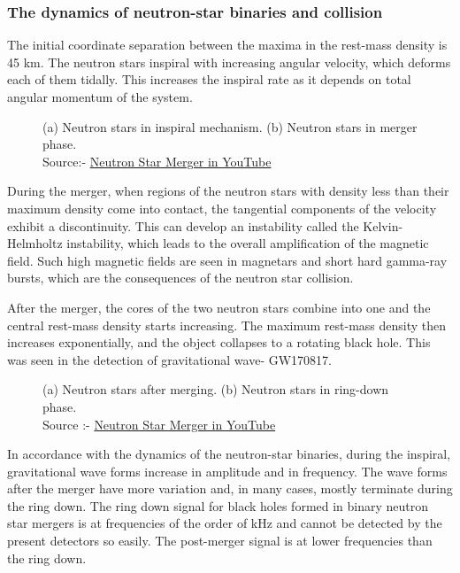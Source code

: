 \subsubsection{The dynamics of neutron-star binaries and collision}

The initial coordinate separation between the maxima in the rest-mass density is 45 km. The neutron stars inspiral with increasing angular velocity, which deforms each of them tidally. This increases the inspiral rate as it depends on total angular momentum of the system. 

\begin{figure}[h]
    \centering
    \qquad
    \caption{(a) Neutron stars in inspiral mechanism. (b) Neutron stars in merger phase.\\ Source:- \href{https://youtu.be/y8VDwGi0r0E}{Neutron Star Merger in YouTube}}
\end{figure}

\noindent
During the merger, when regions of the neutron stars with density less than their maximum density come into contact, the tangential components of the velocity exhibit a discontinuity. This can develop an instability called the Kelvin-Helmholtz instability, which leads to the overall amplification of the magnetic field. Such high magnetic fields are seen in magnetars and short hard gamma-ray bursts, which are the consequences of the neutron star collision.

After the merger, the cores of the two neutron stars combine into one and the central rest-mass density starts increasing. The maximum rest-mass density then increases exponentially, and the object collapses to a rotating black hole. This was seen in the detection of gravitational wave- GW170817.

\begin{figure}[h]
    \centering
    \qquad
    \caption{(a) Neutron stars after merging. (b) Neutron stars in ring-down phase. \\ Source :- \href{https://youtu.be/y8VDwGi0r0E}{Neutron Star Merger in YouTube}} 
\end{figure}

In accordance with the dynamics of the neutron-star binaries, during the inspiral, gravitational wave forms increase in amplitude and in frequency. 
The wave forms after the merger have more variation and, in many cases, mostly terminate during the ring down. The ring down signal for black holes formed in binary neutron star mergers is at frequencies of the order of kHz and cannot be detected by the present detectors so easily. The post-merger signal is at lower frequencies than the ring down.


